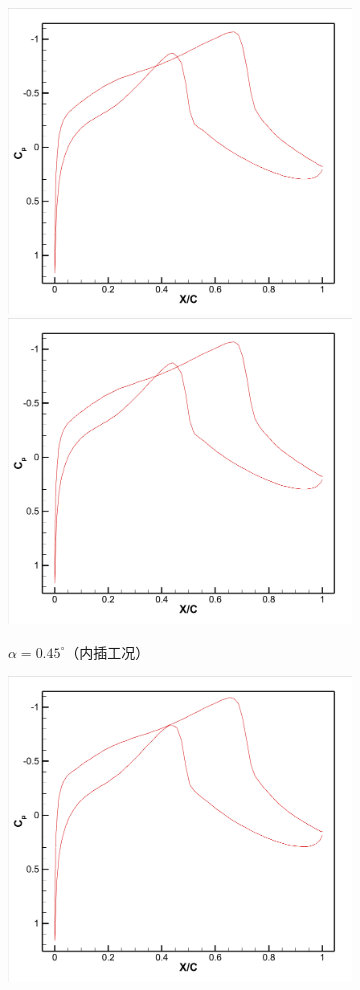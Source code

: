 \begin{figure}[H]
\centering
\begin{subfigure}[b]{0.45\textwidth}
\centering
\includegraphics[width=0.8\linewidth]{0.45真实值.png} \\
\includegraphics[width=0.8\linewidth]{0.45插值.png}
\caption{\songti$\alpha=0.45^\circ$（内插工况）}
\label{fig:alpha0.45}
\end{subfigure}
\hfill
\begin{subfigure}[b]{0.45\textwidth}
\centering
\includegraphics[width=0.8\linewidth]{0.77真实值.png} \\

\end{subfigure}
\end{figure}
